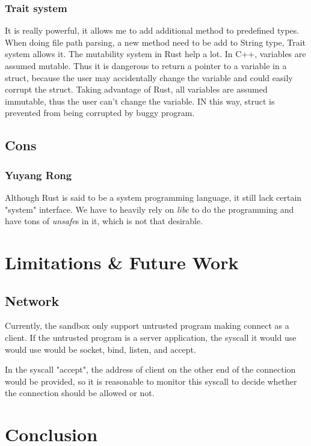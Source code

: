 \documentclass[conference,compsoc]{IEEEtran}
\begin{document}
			\subsubsection{Trait system} It is really powerful, it allows me to add additional method to predefined types. 
			When doing file path parsing, a new method need to be add to String type, Trait system allows it.
			The mutability system in Rust help a lot. 
			In C++, variables are assumed mutable. 
			Thus it is dangerous to return a pointer to a variable in a struct, because the user may accidentally change the variable and could easily corrupt the struct.
			Taking advantage of Rust, all variables are assumed immutable, thus the user can't change the variable. IN this way, struct is prevented from being corrupted by buggy program.
	\subsection{Cons}
		\subsubsection{Yuyang Rong}
			\par
				Although Rust is said to be a system programming language, it still lack certain "system" interface.
				We have to heavily rely on \emph{libc} to do the programming and have tons of \emph{unsafe}s in it, which is not that desirable. 				

\section{Limitations \& Future Work}
	\subsection{Network}
		Currently, the sandbox only support untrusted program making connect as a client. If the untrusted program is a server application, the syscall it would use would use would be socket, bind, listen, and accept. 
		\par
		In the syscall "accept", the address of client on the other end of the connection would be provided, so it is reasonable to monitor this syscall to decide whether the connection should be allowed or not.


\section{Conclusion}
\end{document}
